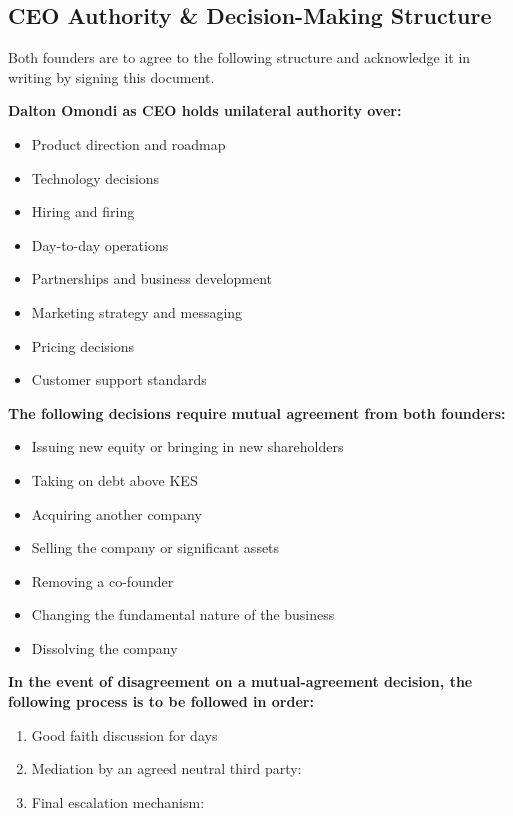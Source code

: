 \documentclass[12pt,a4paper]{article}
\newcommand{\blank}[1][5.5cm]{\underline{\hspace{#1}}}
\begin{document}
\subsection{CEO Authority \& Decision-Making Structure}

Both founders are to agree to the following structure and acknowledge it in writing by signing this document.

\medskip
\noindent\textbf{Dalton Omondi as CEO holds unilateral authority over:}

\begin{itemize}
  \item Product direction and roadmap
  \item Technology decisions
  \item Hiring and firing
  \item Day-to-day operations
  \item Partnerships and business development
  \item Marketing strategy and messaging
  \item Pricing decisions
  \item Customer support standards
\end{itemize}

\noindent\textbf{The following decisions require mutual agreement from both founders:}

\begin{itemize}
  \item Issuing new equity or bringing in new shareholders
  \item Taking on debt above KES \blank[3cm]
  \item Acquiring another company
  \item Selling the company or significant assets
  \item Removing a co-founder
  \item Changing the fundamental nature of the business
  \item Dissolving the company
\end{itemize}

\noindent\textbf{In the event of disagreement on a mutual-agreement decision, the following process is to be followed in order:}

\begin{enumerate}
  \item Good faith discussion for \blank[2cm] days
  \item Mediation by an agreed neutral third party: \blank[5cm]
  \item Final escalation mechanism: \blank[5cm]
\end{enumerate}
\end{document}
